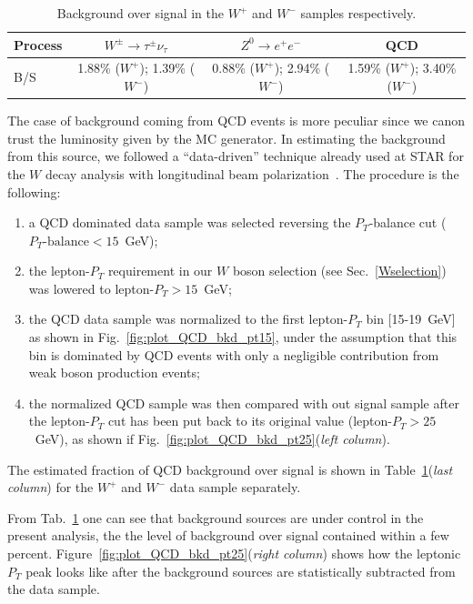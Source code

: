 \documentclass[12pt]{article}
\begin{document}
\begin{table}[htbp]
\centering
\begin{tabular}{| l | c | c  |  c |}
\hline
Process & $W^{\pm}\rightarrow \tau^{\pm} \nu_{\tau}$ & $Z^{0} \rightarrow e^{+}e^{-}$ & QCD \\
\hline
B/S & 1.88\% ($W^{+}$); 1.39\% ($W^{-}$)&  0.88\% ($W^{+}$); 2.94\% ($W^{-}$)& 1.59\% ($W^{+}$); 3.40\% ($W^{-}$)\\
\hline
\end{tabular}
\caption{Background over signal in the $W^{+}$ and $W^{-}$ samples respectively.}
\label{Tab:BoS}
\end{table}

The case of background coming from QCD events is more peculiar since we canon trust the luminosity given by the MC generator. In estimating the background from this source, we followed a ``data-driven'' technique already used at STAR for the $W$ decay analysis with longitudinal beam polarization~\cite{STAR_W_AL_2012-paper, STAR_W_AL_2012-note}. The procedure is the following:

\begin{enumerate}
   \item a QCD dominated data sample was selected reversing the $P_{T}$-balance cut ($P_{T}\text{-balance} < 15$~GeV);
   \item the lepton-$P_{T}$ requirement in our $W$ boson selection (see Sec.~\ref{Wselection}) was lowered to  lepton-$P_{T} > 15$~GeV;
   \item the QCD data sample was normalized to the first lepton-$P_{T}$ bin [15-19~GeV] as shown in Fig.~\ref{fig:plot_QCD_bkd_pt15}, under the assumption that this bin is dominated by QCD events with only a negligible contribution from weak boson production events;
   \item the normalized QCD sample was then compared with out signal sample after the lepton-$P_{T}$ cut has been put back to its original value (lepton-$P_{T} > 25$~GeV), as shown if Fig.~\ref{fig:plot_QCD_bkd_pt25}({\it left column}). 
\end{enumerate}


The estimated fraction of QCD background over signal is shown in Table~\ref{Tab:BoS}({\it last column}) for the $W^{+}$ and $W^{-}$ data sample separately. 

From Tab.~\ref{Tab:BoS} one can see that background sources are under control in the present analysis, the the level of background over signal contained within a few percent. Figure~\ref{fig:plot_QCD_bkd_pt25}({\it right column}) shows how the leptonic $P_{T}$ peak looks like after the background sources are statistically subtracted from the data sample.
\end{document}
